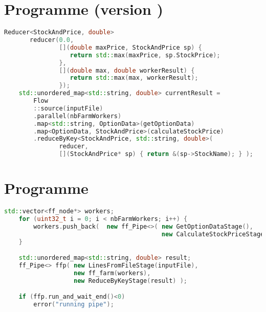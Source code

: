 \section{Programme  (version \ppff)}
\begin{lstlisting}[gobble=4,basicstyle=\ttfamily\footnotesize,language=c++]
    Reducer<StockAndPrice, double>
       reducer(0.0, 
               [](double maxPrice, StockAndPrice sp) {
                  return std::max(maxPrice, sp.StockPrice);
               },
               [](double max, double workerResult) { 
                  return std::max(max, workerResult);
               });
    std::unordered_map<std::string, double> currentResult =
        Flow
        ::source(inputFile)
        .parallel(nbFarmWorkers)
        .map<std::string, OptionData>(getOptionData)
        .map<OptionData, StockAndPrice>(calculateStockPrice)
        .reduceByKey<StockAndPrice, std::string, double>(
               reducer, 
               [](StockAndPrice* sp) { return &(sp->StockName); } );
\end{lstlisting}

\newpage
\section{Programme }
\begin{lstlisting}[gobble=4,basicstyle=\ttfamily\footnotesize,language=c++]
    std::vector<ff_node*> workers;
    for (uint32_t i = 0; i < nbFarmWorkers; i++) {
        workers.push_back(  new ff_Pipe<>( new GetOptionDataStage(),
                                           new CalculateStockPriceStage() ) );
    }        

    std::unordered_map<std::string, double> result;
    ff_Pipe<> ffp( new LinesFromFileStage(inputFile),
                   new ff_farm(workers),
                   new ReduceByKeyStage(result) );

    if (ffp.run_and_wait_end()<0)
        error("running pipe");
\end{lstlisting}
